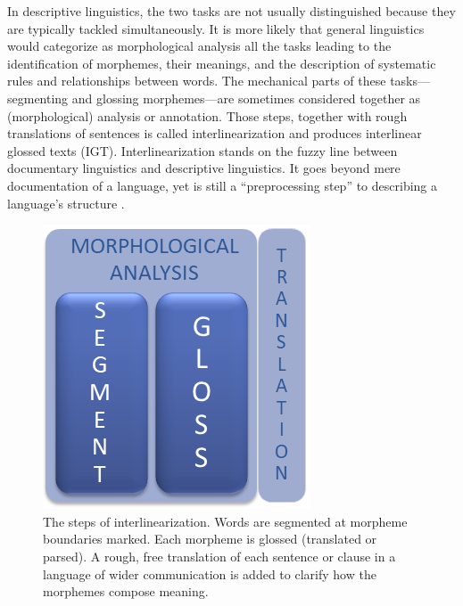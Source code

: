 \documentclass[12pt]{article}
\begin{document}
In descriptive linguistics, the two tasks are not usually distinguished because they are typically tackled simultaneously. It is more likely that general linguistics would categorize as morphological analysis all the tasks leading to the identification of morphemes, their meanings, and the description of systematic rules and relationships between words. The mechanical parts of these tasks---segmenting and glossing morphemes---are sometimes considered together as (morphological) analysis or annotation. Those steps, together with rough translations of sentences is called interlinearization and produces interlinear glossed texts (IGT). Interlinearization stands on the fuzzy line between documentary linguistics and descriptive linguistics. It goes beyond mere documentation of a language, yet is still a ``preprocessing step'' to describing a language's structure \cite{moon_unsupervised_2009}.  

\begin{figure}[ht]
\label{fig:IGT}
\begin{center}
\includegraphics[width=0.7\columnwidth]{IGT.PNG}
\caption{The steps of interlinearization. Words are segmented at morpheme boundaries marked. Each morpheme is glossed (translated or parsed). A rough, free translation of each sentence or clause in a language of wider communication is added to clarify how the morphemes compose meaning.}
\end{center}
\end{figure}
 
\end{document}
